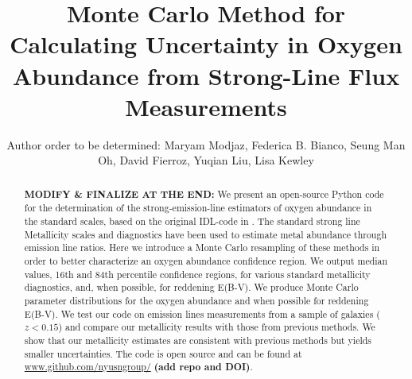 \documentclass{emulateapj}
\begin{document}
\title{Monte Carlo Method for Calculating Uncertainty in Oxygen Abundance from Strong-Line Flux Measurements}

\author{Author order to be determined: Maryam Modjaz, Federica B. Bianco, Seung Man Oh, David Fierroz, Yuqian Liu, Lisa Kewley}
 
 
\begin{abstract}
\textbf{MODIFY \& FINALIZE AT THE END:} We present an open-source Python code for the determination of the strong-emission-line estimators of oxygen abundance in the standard scales, based on the original IDL-code in \citet{kewley02}. The standard strong line Metallicity scales and diagnostics  have been used to estimate metal abundance through emission line ratios. Here we introduce a Monte Carlo resampling of these methods in order to better characterize an oxygen abundance confidence region.  We output median values, 16th and 84th percentile confidence regions, for various standard metallicity diagnostics, and, when possible, for reddening E(B-V). We produce Monte Carlo parameter distributions for the oxygen abundance and when possible for reddening E(B-V). We test our code on emission lines measurements from a sample of galaxies ($z<0.15$) and compare our metallicity results with those from previous methods. We show that our metallicity estimates are consistent with previous methods but yields smaller uncertainties. The code is open source and can be found at \url{www.github.com/nyusngroup/} \textbf{
(add repo and DOI)}.
\end{abstract}
 
\end{document}
